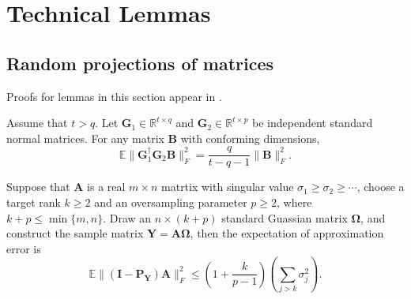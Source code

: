 \section{Technical Lemmas}
\subsection{Random projections of matrices}\label{s-matrix-projections}
Proofs for lemmas in this section appear in \cite[chapters 9 and 10]{halko2011finding}.
\begin{lem}
\label{lemma:expectation_inverse_gaussian}
Assume that $t>q$. Let $\mathbf{G}_1\in \mathbb{R}^{t\times q}$ and $\mathbf{G}_2\in \mathbb{R}^{t\times p}$ be independent standard normal matrices. For any matrix $\mathbf{B}$ with conforming dimensions,
\begin{equation}
\mathbb{E} \|\mathbf{G}_1^\dag \mathbf{G}_2 \mathbf{B}\|_F^2 = \frac{q}{t-q-1} \|\mathbf{B}\|_F^2. \nonumber
\end{equation}
\end{lem}

\begin{lem}
\label{lemma:sketchy_column_space_err}
Suppose that $\mathbf{A}$ is a real $m\times n$ matrtix with singular value $\sigma_1\ge \sigma_2\ge \cdots$, choose a target rank $k\ge 2$ and an oversampling parameter $p\ge 2$, where $k+p\le \min\{m,n\}$. Draw an $n\times (k+p)$ standard Guassian matrix $\mathbf{\Omega}$, and construct the sample matrix $\mathbf{Y}=\mathbf{A\Omega}$, then the expectation of approximation error is
\begin{equation}
\mathbb{E}\|(\mathbf{I} - \mathbf{P_Y})\mathbf{A}\|_F^2\le \left(1+\frac{k}{p-1}\right)\left(\sum_{j>k} \sigma_j^2\right).\nonumber
\end{equation}
\end{lem}


